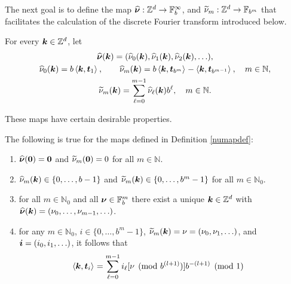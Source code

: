 \documentclass[graybox,footinfo]{svmult}
\newcommand{\Z}{\mathbb{Z}} %
\newcommand{\N}{\mathbb{N}} %
\newcommand{\F}{\mathbb{F}} %
\newcommand{\bszero}{\boldsymbol{0}} %
\newcommand{\bst}{\boldsymbol{t}}    %
\begin{document}
The next goal is to define the map $\hbsnu : \Z^d \to \F_b^{\infty}$, and $\tnu_m : \Z^d \to \F_{b^m}$ that facilitates the calculation of the discrete Fourier transform introduced below.

\begin{definition} \label{numapdef} For every $\bsk \in \Z^d$, let
\begin{subequations} \label{numapdefeq}
\begin{gather}
\hbsnu(\bsk)=(\hnu_0(\bsk), \hnu_1(\bsk), \hnu_2(\bsk), \ldots ), \\
\hnu_0(\bsk) = b\ip{\bsk}{\bst_{1}}, \qquad \hnu_m(\bsk)=b\ip{\bsk}{\bst_{b^m}}-\ip{\bsk}{\bst_{b^{m-1}}}, \quad m \in \N, \\
\tnu_m(\bsk) = \sum_{\ell=0}^{m-1} \hnu_{\ell}(\bsk) b^{\ell}, \quad m \in \N.
\end{gather}
\end{subequations}
\end{definition}

These maps have certain desirable properties.

\begin{lemma} \label{numaplem} The following is true for the maps defined in Definition \ref{numapdef}:
\begin{enumerate}
\renewcommand{\labelenumi}{\alph{enumi})}

\item $\hbsnu(\bszero)=\bszero$ and $\tnu_m(\bszero) = 0$ for all $m \in \N$.

\item $\widehat{\nu}_m(\boldsymbol{k})\in \{0,\dots,b-1\}$ and $\widetilde{\nu}_m(\boldsymbol{k})\in \{0,\dots,b^m-1\}$ for all $m\in\N_0$.

\item for all $m\in \N_0$ and all $\bsnu \in \F_b^{m}$ there exist a unique $\bsk \in \Z^d$ with $\widehat{\boldsymbol{\nu}}(\boldsymbol{k})=(\nu_0, \ldots, \nu_{m-1}, \ldots)$.

\item for any $m \in \N_0$, $i \in \{0, \ldots, b^m-1\}$,  $\widetilde{\nu}_m(\boldsymbol{k})=\nu=(\nu_0, \nu_1, \ldots)$, and $\boldsymbol{i}=(i_0, i_1, \ldots)$, it follows that
\begin{align} \label{nuwisum}
\begin{split}
\ip{\bsk}{\bst_i} &= \sum_{\ell=0}^{m-1} i_\ell [\nu \pmod  {b^{(l+1)}}]  b^{-(l+1)} \pmod 1
\end{split}
\end{align}

\end{enumerate}
\end{lemma}
\end{document}
